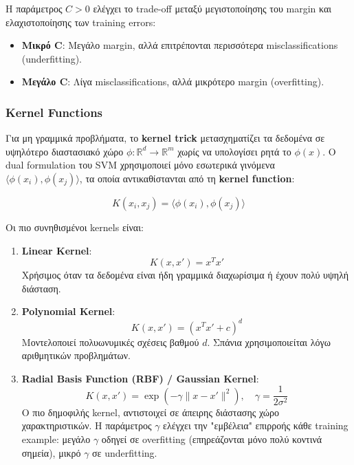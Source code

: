 \documentclass[12pt,a4paper,twoside]{book}
\begin{document}
Η παράμετρος \(C > 0\) ελέγχει το trade-off μεταξύ μεγιστοποίησης του margin και ελαχιστοποίησης των training errors:

\begin{itemize}
    \item \textbf{Μικρό C}: Μεγάλο margin, αλλά επιτρέπονται περισσότερα misclassifications (underfitting).
    \item \textbf{Μεγάλο C}: Λίγα misclassifications, αλλά μικρότερο margin (overfitting).
\end{itemize}

\subsubsection{Kernel Functions}

Για μη γραμμικά προβλήματα, το \textbf{kernel trick} μετασχηματίζει τα δεδομένα σε υψηλότερο διαστασιακό χώρο \(\phi: \mathbb{R}^d \rightarrow \mathbb{R}^m\) χωρίς να υπολογίσει ρητά το \(\phi(x)\). Ο dual formulation του SVM χρησιμοποιεί μόνο εσωτερικά γινόμενα \(\langle \phi(x_i), \phi(x_j) \rangle\), τα οποία αντικαθίστανται από τη \textbf{kernel function}:

\begin{equation}
    K(x_i, x_j) = \langle \phi(x_i), \phi(x_j) \rangle
\end{equation}

Οι πιο συνηθισμένοι kernels είναι:

\begin{enumerate}
    \item \textbf{Linear Kernel}:
          \begin{equation}
              K(x, x') = x^T x'
          \end{equation}
          Χρήσιμος όταν τα δεδομένα είναι ήδη γραμμικά διαχωρίσιμα ή έχουν πολύ υψηλή διάσταση.

    \item \textbf{Polynomial Kernel}:
          \begin{equation}
              K(x, x') = (x^T x' + c)^d
          \end{equation}
          Μοντελοποιεί πολυωνυμικές σχέσεις βαθμού \(d\). Σπάνια χρησιμοποιείται λόγω αριθμητικών προβλημάτων.

    \item \textbf{Radial Basis Function (RBF) / Gaussian Kernel}:
          \begin{equation}
              K(x, x') = \exp\left(-\gamma \|x - x'\|^2\right), \quad \gamma = \frac{1}{2\sigma^2}
          \end{equation}
          Ο πιο δημοφιλής kernel, αντιστοιχεί σε άπειρης διάστασης χώρο χαρακτηριστικών. Η παράμετρος \(\gamma\) ελέγχει την "εμβέλεια" επιρροής κάθε training example: μεγάλο \(\gamma\) οδηγεί σε overfitting (επηρεάζονται μόνο πολύ κοντινά σημεία), μικρό \(\gamma\) σε underfitting.
\end{enumerate}
\end{document}
